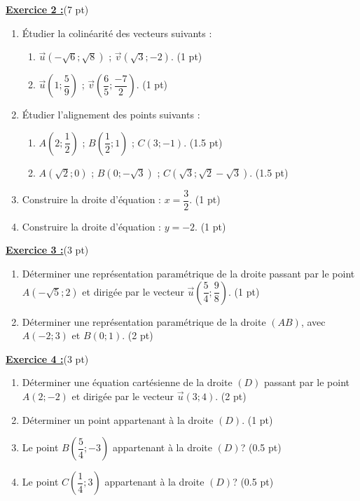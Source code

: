 \documentclass[12pt,a4paper]{article}
\begin{document}
\underline{\large\textbf{Exercice 2 :}}(7 pt)
\begin{enumerate}
	\item Étudier la colinéarité des vecteurs suivants :
		\begin{enumerate}
			\item $\vec{u}(-\sqrt{6};\sqrt{8})$ ; $\vec{v}(\sqrt{3}; -2)$. (1 pt)
			\item $\vec{u}\left(1;\dfrac{5}{9}\right)$ ; $\vec{v}\left(\dfrac{6}{5}; \dfrac{-7 }{2}\right)$. (1 pt)
		\end{enumerate}
	\item Étudier l'alignement des points suivants :
		\begin{enumerate}
			\item $A\left(2;\dfrac{1}{2}\right)$ ; $B\left(\dfrac{1}{2};1\right)$ ; $C\left(3;-1\right)$. (1.5 pt)
			\item $A(\sqrt{2};0)$ ; $B(0;-\sqrt{3})$ ; $C\left(\sqrt{3};\sqrt{2} - \sqrt{3}\right)$. (1.5 pt)
		\end{enumerate}
	\item Construire la droite d'équation : $x = \dfrac{3}{2}$. (1 pt)
	\item Construire la droite d'équation : $y = -2$. (1 pt)
\end{enumerate}

\underline{\large\textbf{Exercice 3 :}}(3 pt)
\begin{enumerate}
	\item Déterminer une représentation paramétrique de la droite passant par le point $A\left(-\sqrt{5}; 2\right)$ et dirigée par le vecteur $\vec{u}\left(\dfrac{5}{4};\dfrac{9}{8}\right)$. (1 pt)
	\item Déterminer une représentation paramétrique de la droite $(AB)$, avec $A(-2;3)$ et $B(0;1)$. (2 pt)
\end{enumerate}

\underline{\large\textbf{Exercice 4 :}}(3 pt)
\begin{enumerate}
	\item Déterminer une équation cartésienne de la droite $(D)$ passant par le point $A(2;-2)$ et dirigée par le vecteur $\vec{u}(3;4)$. (2 pt)
	\item Déterminer un point appartenant à la droite $(D)$. (1 pt)
	\item Le point $B\left(\dfrac{5}{4}; -3\right)$ appartenant à la droite $(D)$? (0.5 pt)
	\item Le point $C\left(\dfrac{1}{4}; 3\right)$ appartenant à la droite $(D)$? (0.5 pt)
\end{enumerate}
\end{document}
